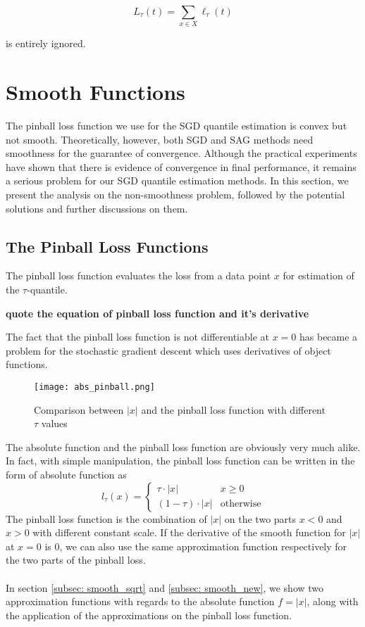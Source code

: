 \begin{equation}
    L_{\tau}(t) = \sum_{x \in X} \ell_{\tau}(t)
\end{equation}

is entirely ignored.


\graphicspath{{Figures/Smooth_func/}{./}} 

\section{Smooth Functions}
The pinball loss function we use for the SGD quantile estimation is convex but not smooth. 
Theoretically, however, both SGD and SAG methods need smoothness for the guarantee of convergence. Although the practical experiments have shown that there is evidence of convergence in final performance, it remains a serious problem for our SGD quantile estimation methods. In this section, we present the analysis on the non-smoothness problem, followed by the potential solutions and further discussions on them.

\subsection{The Pinball Loss Functions}
The pinball loss function evaluates the loss from a data point $x$ for estimation of the $\tau$-quantile.

\textbf{quote the equation of pinball loss function and it's derivative}

The fact that the pinball loss function is not differentiable at $x= 0$ has became a problem for the stochastic gradient descent which uses derivatives of object functions.

\begin{figure*}[h!]
	\texttt{[image: abs\_pinball.png]}
	\caption{Comparison between $|x|$ and the pinball loss function with different $\tau$ values}
\end{figure*}

The absolute function and the pinball loss function are obviously very much alike. In fact, with simple manipulation, the pinball loss function can be written in the form of absolute function as 
\begin{equation}
    l_\tau(x) = 
    \begin{cases}
        \tau \cdot |x| & {x \geq 0} \\
        (1-\tau) \cdot |x| & \text{otherwise}
    \end{cases}
\end{equation}
The pinball loss function is the combination of $|x|$ on the two parts $x<0$ and $x>0$ with different constant scale. 
If the derivative of the smooth function for $|x|$ at $x=0$ is $0$, we can also use the same approximation function respectively for the two parts of the pinball loss.
\\\\
In section \ref{subsec: smooth_sqrt} and \ref{subsec: smooth_new}, we show two approximation functions with regards to the absolute function $f = |x|$, along with the application of the approximations on the pinball loss function.

